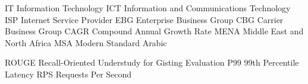     {IT}    {Information Technology}
   {ICT}   {Information and Communications Technology}
   {ISP}   {Internet Service Provider}
   {EBG}   {Enterprise Business Group}
   {CBG}   {Carrier Business Group}
  {CAGR}  {Compound Annual Growth Rate}
  {MENA}  {Middle East and North Africa}
   {MSA}   {Modern Standard Arabic}

 {ROUGE} {Recall-Oriented Understudy for Gisting Evaluation}
   {P99}   {99th Percentile Latency}
   {RPS}   {Requests Per Second}
